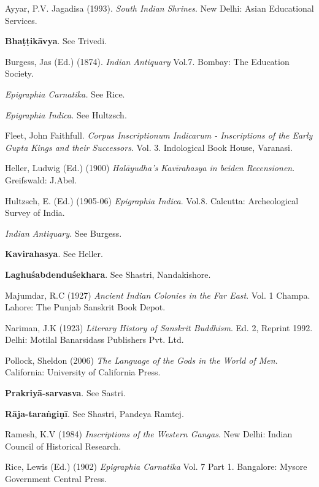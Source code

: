 \begin{thebibliography}{99}
\itemsep=2pt
Ayyar, P.V. Jagadisa (1993). {\sl South Indian Shrines}. New Delhi: Asian Educational Services. 

{\bf Bhaṭṭikāvya}. See Trivedi.

Burgess, Jas (Ed.) (1874). {\sl Indian Antiquary} Vol.7. Bombay: The Education Society.

{\sl Epigraphia Carnatika.} See Rice. 

{\sl Epigraphia Indica.} See Hultzsch. 

Fleet, John Faithfull. {\sl Corpus Inscriptionum Indicarum - Inscriptions of the Early Gupta Kings and their Successors}. Vol. 3. Indological Book House, Varanasi.

Heller, Ludwig (Ed.) (1900) {\sl Halāyudha's Kavīrahasya in beiden Recensionen}. Greifswald: J.Abel.

Hultzsch, E. (Ed.) (1905-06) {\sl Epigraphia Indica}. Vol.8. Calcutta: Archeological Survey of India.

{\sl Indian Antiquary.} See Burgess.

{\bf Kavirahasya}. See Heller. 

{\bf Laghuśabdenduśekhara}. See Shastri, Nandakishore.

Majumdar, R.C (1927) {\sl Ancient Indian Colonies in the Far East}. Vol. 1 Champa. Lahore: The Punjab Sanskrit Book Depot. 

Nariman, J.K (1923) {\sl Literary History of Sanskrit Buddhism}. Ed. 2, Reprint 1992. Delhi: Motilal Banarsidass Publishers Pvt. Ltd. 

Pollock, Sheldon (2006) {\sl The Language of the Gods in the World of Men}. California: University of California Press. 

{\bf Prakriyā-sarvasva}. See Sastri.

{\bf Rāja-taraṅgiṇī}. See Shastri, Pandeya Ramtej.

Ramesh, K.V (1984) {\sl Inscriptions of the Western Gangas}. New Delhi: Indian Council of Historical Research.

Rice, Lewis (Ed.) (1902) {\sl Epigraphia Carnatika} Vol. 7 Part 1. Bangalore: Mysore Government Central Press. 


\end{thebibliography}
